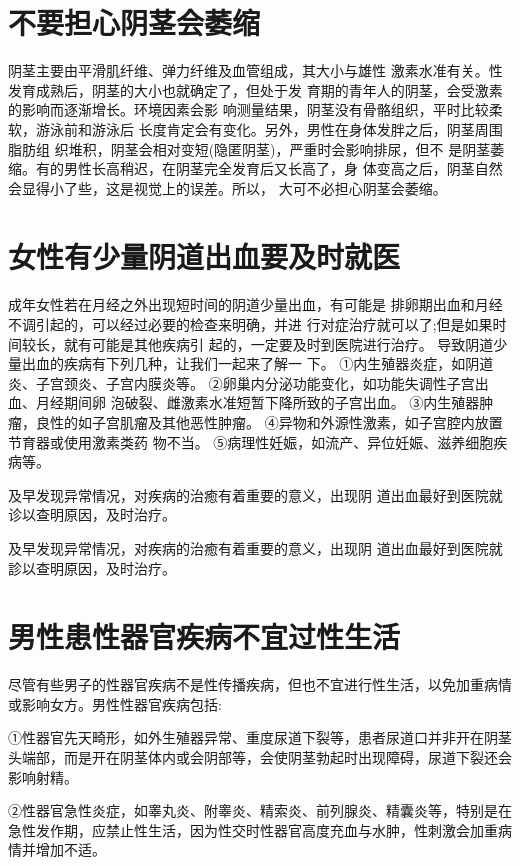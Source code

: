 \documentclass[12pt,UTF8]{ctexbook}
\begin{document}
\section{不要担心阴茎会萎缩}
阴茎主要由平滑肌纤维、弹力纤维及血管组成，其大小与雄性
激素水准有关。性发育成熟后，阴茎的大小也就确定了，但处于发
育期的青年人的阴茎，会受激素的影响而逐渐增长。环境因素会影
响测量结果，阴茎没有骨骼组织，平时比较柔软，游泳前和游泳后
长度肯定会有变化。另外，男性在身体发胖之后，阴茎周围脂肪组
织堆积，阴茎会相对变短(隐匿阴茎)，严重时会影响排尿，但不
是阴茎萎缩。有的男性长高稍迟，在阴茎完全发育后又长高了，身
体变高之后，阴茎自然会显得小了些，这是视觉上的误差。所以，
大可不必担心阴茎会萎缩。

\section{女性有少量阴道出血要及时就医}

成年女性若在月经之外出现短时间的阴道少量出血，有可能是
排卵期出血和月经不调引起的，可以经过必要的检查来明确，并进
行对症治疗就可以了;但是如果时间较长，就有可能是其他疾病引
起的，一定要及时到医院进行治疗。
导致阴道少量出血的疾病有下列几种，让我们一起来了解一
下。
①内生殖器炎症，如阴道炎、子宫颈炎、子宫内膜炎等。
②卵巢内分泌功能变化，如功能失调性子宫出血、月经期间卵
泡破裂、雌激素水准短暂下降所致的子宫出血。
③内生殖器肿瘤，良性的如子宫肌瘤及其他恶性肿瘤。
④异物和外源性激素，如子宫腔内放置节育器或使用激素类药
物不当。
⑤病理性妊娠，如流产、异位妊娠、滋养细胞疾病等。

及早发现异常情况，对疾病的治癒有着重要的意义，出现阴
道出血最好到医院就诊以查明原因，及时治疗。

及早发现异常情况，对疾病的治癒有着重要的意义，出现阴
道出血最好到医院就診以查明原因，及时治疗。

\section{男性患性器官疾病不宜过性生活}

尽管有些男子的性器官疾病不是性传播疾病，但也不宜进行性生活，以免加重病情或影响女方。男性性器官疾病包括:

①性器官先天畸形，如外生殖器异常、重度尿道下裂等，患者尿道口并非开在阴茎头端部，而是开在阴茎体内或会阴部等，会使阴茎勃起时出现障碍，尿道下裂还会影响射精。

②性器官急性炎症，如睾丸炎、附睾炎、精索炎、前列腺炎、精囊炎等，特别是在急性发作期，应禁止性生活，因为性交时性器官高度充血与水肿，性刺激会加重病情并增加不适。
\end{document}
